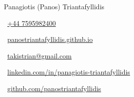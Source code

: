 \begin{huge}
    Panagiotis (Panos) Triantafyllidis
\end{huge}

\vspace{0.5em}

\begin{small}
    \begin{small}\faMobile*\end{small}~\href{tel:+447595982400}{+44 7595982400}
    \quad
    \begin{small}\faHome\end{small}~\href{https://panostriantafyllidis.github.io/}{panostriantafyllidis.github.io}
    \quad
    \begin{small}\faEnvelope\end{small}~\href{mailto:takistrian@gmail.com}{takistrian@gmail.com}
    \quad
    \begin{small}\faLinkedinIn\end{small}~\href{https://www.linkedin.com/in/panagiotis-triantafyllidis/}{linkedin.com/in/panagiotis-triantafyllidis}
    \quad
    \begin{small}\faGithub\end{small}~\href{https://github.com/panostriantafyllidis}{github.com/panostriantafyllidis}
\end{small}
